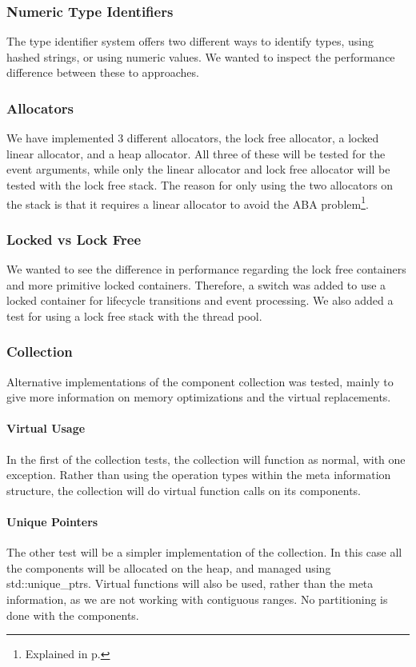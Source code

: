 \subsubsection{Numeric Type Identifiers}
The type identifier system offers two different ways to identify types, using
hashed strings, or using numeric values.
We wanted to inspect the performance difference between these to approaches.

\subsubsection{Allocators}
We have implemented 3 different allocators, the lock free allocator,
a locked linear allocator, and a heap allocator.
All three of these will be tested for the event arguments, while only the
linear allocator and lock free allocator will be tested with the lock free stack.
The reason for only using the two allocators on the stack is that it requires
a linear allocator to avoid the ABA problem\footnote{Explained in p.\pageref{subpar:detailed_lock_free_allocator_aba}}.

\subsubsection{Locked vs Lock Free}
We wanted to see the difference in performance regarding the lock free containers
and more primitive locked containers.
Therefore, a switch was added to use a locked container for lifecycle transitions and event processing.
We also added a test for using a lock free stack with the thread pool.

\subsubsection{Collection}
Alternative implementations of the component collection was tested,
mainly to give more information on memory optimizations and the virtual
replacements.

\paragraph{Virtual Usage}
In the first of the collection tests, the collection will function as normal, with one exception.
Rather than using the operation types within the meta information structure,
the collection will do virtual function calls on its components.

\paragraph{Unique Pointers}
The other test will be a simpler implementation of the collection.
In this case all the components will be allocated on the heap, and managed
using std::unique\_ptrs.
Virtual functions will also be used, rather than the meta information,
as we are not working with contiguous ranges.
No partitioning is done with the components.

